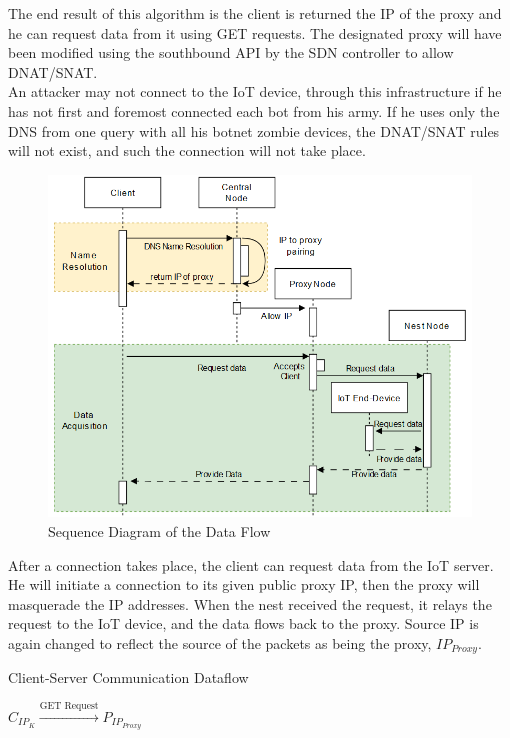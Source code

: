 \documentclass[conference]{IEEEtran}
\begin{document}
The end result of this algorithm is the client is returned the IP of the proxy and he can request data from it using GET requests. The designated proxy will have been modified using the southbound API by the SDN controller to allow DNAT/SNAT.\\

An attacker may not connect to the IoT device, through this infrastructure if he has not first and foremost connected each bot from his army. If he uses only the DNS from one query with all his botnet zombie devices, the DNAT/SNAT rules will not exist, and such the connection will not take place.

\begin{figure}
    \centering
    \includegraphics[width=1\linewidth]{images/sequence_diagram.png}
    \caption{Sequence Diagram of the Data Flow}
\end{figure}

After a connection takes place, the client can request data from the IoT server. He will initiate a connection to its given public proxy IP, then the proxy will masquerade the IP addresses. When the nest received the request, it relays the request to the IoT device, and the data flows back to the proxy. Source IP is again changed to reflect the source of the packets as being the proxy, $IP_{Proxy}$.

\begin{algorithm}
\caption{Client-Server Communication Dataflow}
\label{alg:data-flow}
\SetAlgoLined
{}
\vspace{6pt}
$C_{IP_K} \xrightarrow{\text{GET Request}} P_{IP_{Proxy}}$\;
\vspace{4pt}
\end{algorithm}
\end{document}
